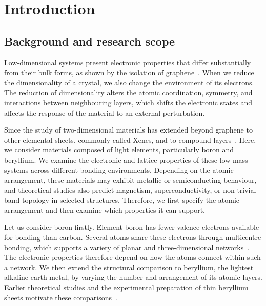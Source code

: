 \chapter{Introduction}
\label{cha:introduction}

\section{Background and research scope}
\label{sec:intro_background}

Low-dimensional systems present electronic properties that differ substantially from their bulk forms, as shown by the isolation of graphene~\cite{novoselov2004electric,geim2007rise}.
When we reduce the dimensionality of a crystal, we also change the environment of its electrons.
The reduction of dimensionality alters the atomic coordination, symmetry, and interactions between neighbouring layers,
which shifts the electronic states and affects the response of the material to an external perturbation.

Since the study of two-dimensional materials has extended beyond graphene to other elemental sheets, commonly called Xenes, and to compound layers~\cite{butler2013progress,molle2018silicene}.
Here, we consider materials composed of light elements, particularly boron and beryllium.
We examine the electronic and lattice properties of these low-mass systems across different bonding environments.
Depending on the atomic arrangement, these materials may exhibit metallic or semiconducting behaviour, and theoretical studies also predict magnetism, superconductivity, or non-trivial band topology in selected structures.
Therefore, we first specify the atomic arrangement and then examine which properties it can support.

Let us consider boron firstly.
Element boron has fewer valence electrons available for bonding than carbon.
Several atoms share these electrons through multicentre bonding, which supports a variety of planar and three-dimensional networks~\cite{sun2017two,han2023superconducting}.
The electronic properties therefore depend on how the atoms connect within such a network.
We then extend the structural comparison to beryllium, the lightest alkaline-earth metal, by varying the number and arrangement of its atomic layers.
Earlier theoretical studies and the experimental preparation of thin beryllium sheets motivate these comparisons~\cite{ono2020dynamical,chahal2023beryllene,li2023coexistence}.

